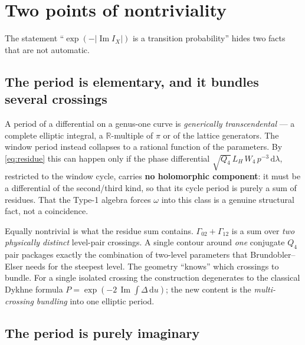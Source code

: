 \documentclass[11pt]{article}
\newcommand{\R}{\mathbb R}
\newcommand{\dd}{\mathrm d}
\newcommand{\im}{\operatorname{Im}}
\begin{document}
\section{Two points of nontriviality}

The statement ``$\exp(-|\im I_X|)$ is a transition probability'' hides two facts
that are not automatic.

\subsection{The period is elementary, and it bundles several crossings}

A period of a differential on a genus-one curve is \emph{generically
transcendental} --- a complete elliptic integral, a $\R$-multiple of $\pi$ or of
the lattice generators. The window period instead collapses to a rational
function of the parameters. By \eqref{eq:residue} this can happen only if the
phase differential $\sqrt{Q_4}\,L_H\,W_4\,p^{-3}\,\dd\lambda$, restricted to the
window cycle, carries \textbf{no holomorphic component}: it must be a
differential of the second/third kind, so that its cycle period is purely a sum
of residues. That the Type-1 algebra forces $\omega$ into this class is a
genuine structural fact, not a coincidence.

Equally nontrivial is what the residue sum contains. $\Gamma_{02}+\Gamma_{12}$
is a sum over \emph{two physically distinct} level-pair crossings. A single
contour around \emph{one} conjugate $Q_4$ pair packages exactly the combination
of two-level parameters that Brundobler--Elser needs for the steepest level. The
geometry ``knows'' which crossings to bundle. For a single isolated crossing the
construction degenerates to the classical Dykhne formula
$P=\exp(-2\,\im\!\int\!\Delta\,\dd u)$; the new content is the
\emph{multi-crossing bundling} into one elliptic period.

\subsection{The period is purely imaginary}
\end{document}
